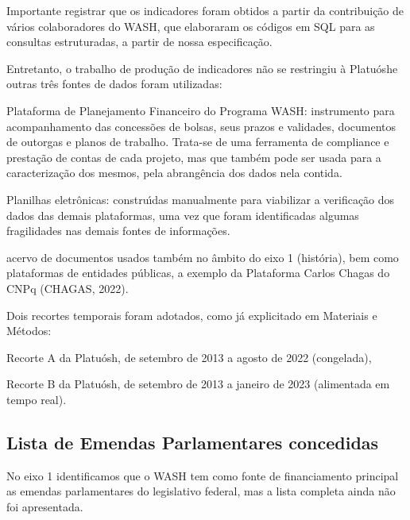 \documentclass[
12pt,		%
openright,	%
twoside,  %
a4paper,			%
chapter=TITLE,		%
english,			%
french,				%
spanish,			%
brazil				%
]{USPSC-classe/USPSC}
\begin{document}
Importante registrar que os indicadores foram obtidos a partir da contribui\c{c}\~ao de v\'arios colaboradores do WASH, que elaboraram os c\'odigos em SQL para as consultas estruturadas, a partir de nossa especifica\c{c}\~ao.








Entretanto, o trabalho de produ\c{c}\~ao de indicadores n\~ao se restringiu \`a \textquotedbl Platu\'osh\textquotedbl  e outras tr\^es fontes de dados foram utilizadas:









\begin{alineas}
\item Plataforma de Planejamento Financeiro do Programa WASH: instrumento para acompanhamento das concess\~oes de bolsas, seus prazos e validades, documentos de outorgas e planos de trabalho. Trata-se de uma ferramenta de compliance e presta\c{c}\~ao de contas de cada projeto, mas que tamb\'em pode ser usada para a caracteriza\c{c}\~ao dos mesmos, pela abrang\^encia dos dados nela contida.
\item Planilhas eletr\^onicas: constru\'{\i}das  manualmente para viabilizar a verifica\c{c}\~ao dos dados das demais plataformas, uma vez que foram identificadas algumas fragilidades nas demais fontes de informa\c{c}\~oes.
\item acervo de documentos usados tamb\'em no \^ambito do eixo 1 (hist\'oria), bem como plataformas de entidades p\'ublicas, a exemplo da Plataforma Carlos Chagas do CNPq  (CHAGAS, 2022).
\end{alineas}

Dois recortes temporais foram adotados, como j\'a explicitado em Materiais e M\'etodos:









\begin{alineas}
\item Recorte A da Platu\'osh, de setembro de 2013 a agosto de 2022 (congelada),
\item Recorte B da Platu\'osh, de setembro de 2013 a janeiro de 2023 (alimentada em tempo real).
\end{alineas}

\subsection[Lista de Emendas Parlamentares concedidas]{Lista de Emendas Parlamentares concedidas}\label{Lista de Emendas Parlamentares concedidas}
No eixo 1 identificamos que o WASH tem como fonte de financiamento principal as emendas parlamentares do legislativo federal, mas a lista completa ainda n\~ao foi apresentada.
\end{document}
